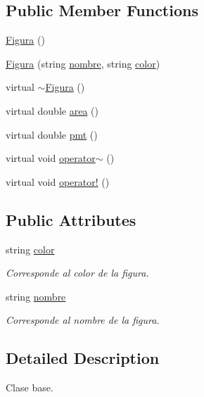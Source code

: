 \subsection*{Public Member Functions}
\begin{DoxyCompactItemize}
\item 
\hyperlink{class_figura_a6977c7f0438c11b985a9a74c208b51c8}{Figura} ()
\item 
\hyperlink{class_figura_a35962837dabe47162c4f7549175f6f81}{Figura} (string \hyperlink{class_figura_a5be336617ed8a4d4f28115297b38da02}{nombre}, string \hyperlink{class_figura_a9f519b9504b95440f124a3099070e952}{color})
\item 
virtual \hyperlink{class_figura_a6130eb548893c36efcb7933e2da6821e}{$\sim$\+Figura} ()
\item 
virtual double \hyperlink{class_figura_ade6b12995c86cb72e37738668d77963d}{area} ()
\item 
virtual double \hyperlink{class_figura_a522ea732b30ffa838731fced76a593ef}{pmt} ()
\item 
virtual void \hyperlink{class_figura_ab0e96a77be9c277b66b7ae73172fdcb0}{operator$\sim$} ()
\item 
virtual void \hyperlink{class_figura_a361ecd93374af526d5b791b7b67d510a}{operator!} ()
\end{DoxyCompactItemize}
\subsection*{Public Attributes}
\begin{DoxyCompactItemize}
\item 
string \hyperlink{class_figura_a9f519b9504b95440f124a3099070e952}{color}
\begin{DoxyCompactList}\small\item\em Corresponde al color de la figura. \end{DoxyCompactList}\item 
string \hyperlink{class_figura_a5be336617ed8a4d4f28115297b38da02}{nombre}
\begin{DoxyCompactList}\small\item\em Corresponde al nombre de la figura. \end{DoxyCompactList}\end{DoxyCompactItemize}


\subsection{Detailed Description}
Clase base. 


